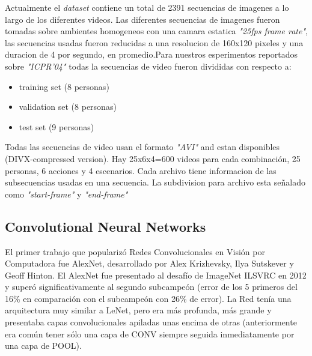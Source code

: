 Actualmente el \textit{dataset} contiene un total de 2391 secuencias de imagenes a lo largo de los diferentes videos. Las diferentes secuencias de imagenes fueron tomadas sobre ambientes homogeneos con una camara estatica \textit{"25fps frame rate"}, las secuencias usadas fueron reducidas a una resolucion de 160x120 pixeles y una duracion de 4 por segundo, en promedio.Para nuestros esperimentos reportados sobre \textit{"ICPR'04"} todas la secuencias de video fueron divididas con respecto a:
\begin{itemize}
\item training set (8 personas)
\item validation set (8 personas)
\item test set (9 personas)
\end{itemize}
	
Todas las secuencias de video usan el formato \textit{"AVI"} and estan disponibles (DIVX-compressed version). Hay 25x6x4=600 videos para cada combinación, 25 personas, 6 acciones y 4 escenarios. Cada archivo tiene informacion de las subsecuencias usadas en una secuencia. La subdivision para archivo esta señalado como \textit{"start-frame"} y \textit{"end-frame"} 



\subsection{Convolutional Neural Networks}
El primer trabajo que popularizó Redes Convolucionales en Visión por Computadora fue AlexNet, desarrollado por Alex Krizhevsky, Ilya Sutskever y Geoff Hinton. El AlexNet fue presentado al desafío de ImageNet ILSVRC en 2012 y superó significativamente al segundo subcampeón (error de los 5 primeros del 16\% en comparación con el subcampeón con 26\% de error). La Red tenía una arquitectura muy similar a LeNet, pero era más profunda, más grande y presentaba capas convolucionales apiladas unas encima de otras (anteriormente era común tener sólo una capa de CONV siempre seguida inmediatamente por una capa de POOL). \cite{link10-CS231n_Convolutional_Neural_Networks_for_Visual_Recognition}
